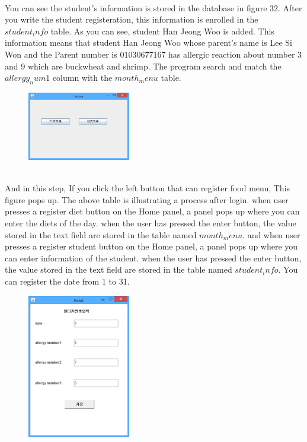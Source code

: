 \documentclass[a4paper,11pt]{IEEEtran}
\begin{document}
{{{\begin{figure}[!h]
        \caption{}
        \label{fig1}
\end{figure}
~\\
You can see the student’s information is stored in the database in figure 32. After you write the student registeration, this information is enrolled in the $student_info$ table. As you can see, student Han Jeong Woo is added. This information means that student Han Jeong Woo whose parent's name is Lee Si Won and the Parent number is 01030677167 has allergic reaction about number 3 and 9 which are buckwheat and shrimp. The program search and match the $allergy_num1$ column with the $month_menu$ table.
~\\
\newpage
\begin{figure}[!h]
        \centering
        \includegraphics[width=0.4\textwidth]{usec11.jpg}
        \caption{}
        \label{fig1}
\end{figure}
~\\
And in this step, If you click the left button that can register food menu, This figure pops up.
The above table is illustrating a process after login. when user presses a register diet button on the Home panel, a panel pops up where you can enter the diets of the day. when the user has pressed the enter button, the value stored in the text field are stored in the table named $month_menu$. and when user presses a register student button on the Home panel, a panel pops up where you can enter information of the student. when the user has pressed the enter button, the value stored in the text field are stored in the table named $student_info$.
You can register the date from 1 to 31.
~\\
\begin{figure}[!h]
        \centering
        \includegraphics[width=0.4\textwidth]{usec12.jpg}

\end{figure}}}}
\end{document}

